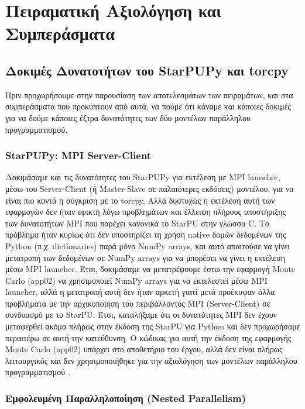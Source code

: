 
\chapter{Πειραματική Αξιολόγηση και Συμπεράσματα}   

\section{Δοκιμές Δυνατοτήτων του StarPUPy και torcpy}

Πριν προχωρήσουμε στην παρουσίαση των αποτελεσμάτων των πειραμάτων, και στα συμπεράσματα που προκύπτουν από αυτά, να πούμε ότι κάναμε και κάποιες δοκιμές για να δούμε κάποιες έξτρα δυνατότητες των δύο μοντέλων παράλληλου προγραμματισμού.

\subsection{StarPUPy: MPI Server-Client}

Δοκιμάσαμε και τις δυνατότητες του StarPUPy για εκτέλεση με MPI launcher, μέσω του Server-Client (ή Master-Slave σε παλαιότερες εκδόσεις) μοντέλου, για να είναι πιο κοντά η σύγκριση με το torcpy. Αλλά δυστυχώς η εκτέλεση αυτή των εφαρμογών δεν ήταν εφικτή λόγω προβλημάτων και έλλειψη πλήρους υποστήριξης των δυνατοτήτων MPI που παρέχει κανονικά το StarPU στην γλώσσα C. Το πρόβλημα ήταν κυρίως ότι δεν υποστηρίζει τη χρήση native δομών δεδομένων της Python (π.χ. dictionaries) παρά μόνο NumPy arrays, και αυτό απαιτούσε να γίνει μετατροπή των δεδομένων σε NumPy arrays για να μπορέσει να γίνει η εκτέλεση μέσω MPI launcher. Έτσι, δοκιμάσαμε να μετατρέψουμε έστω την εφαρμογή Monte Carlo (app02) να χρησιμοποιεί NumPy arrays για να εκτελεστεί μέσω MPI launcher, αλλά η μετατροπή αυτή δεν ήταν αρκετή γιατί μετά προέκυψαν άλλα προβλήματα με την αρχικοποίηση του περιβάλλοντος MPI (Server-Client) σε συνδυασμό με το StarPU. Έτσι, καταλήξαμε ότι οι δυνατότητες MPI δεν έχουν μεταφερθεί ακόμα πλήρως στην έκδοση της StarPU για Python και δεν προχωρήσαμε περαιτέρω σε αυτή την κατεύθυνση. Ο κώδικας για αυτή την έκδοση της εφαρμογής Monte Carlo (app02) υπάρχει στο αποθετήριο του έργου, αλλά δεν είναι πλήρως λειτουργικός και δεν χρησιμοποιήθηκε για την αξιολόγηση των μοντέλων παράλληλου προγραμματισμού \cite{appcode}. 

\subsection{Εμφολευμένη Παραλληλοποίηση (Nested Parallelism)}

